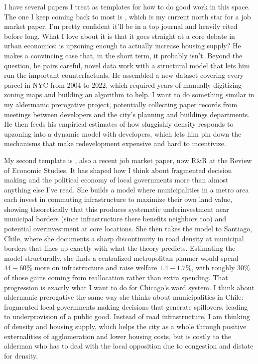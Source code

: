 \documentclass{article}
\begin{document}
I have several papers I treat as templates for how to do good work in this space.
The one I keep coming back to most is \cite{rollet_zoning_2025}, which is my current north star for a job market paper.
I'm pretty confident it'll be in a top journal and heavily cited before long.
What I love about it is that it goes straight at a core debate in urban economics: is upzoning enough to actually increase housing supply?
He makes a convincing case that, in the short term, it probably isn't.
Beyond the question, he pairs careful, novel data work with a structural model that lets him run the important counterfactuals.
He assembled a new dataset covering every parcel in NYC from 2004 to 2022, which required years of manually digitizing zoning maps and building an algorithm to help.
I want to do something similar in my aldermanic prerogative project, potentially collecting paper records from meetings between developers and the city's planning and buildings departments.
He then feeds his empirical estimates of how sluggishly density responds to upzoning into a dynamic model with developers, which lets him pin down the mechanisms that make redevelopment expensive and hard to incentivize.

My second template is \cite{bordeu_commuting_2025}, also a recent job market paper, now R\&R at the Review of Economic Studies.
It has shaped how I think about fragmented decision making and the political economy of local governments more than almost anything else I've read.
She builds a model where municipalities in a metro area each invest in commuting infrastructure to maximize their own land value, showing theoretically that this produces systematic underinvestment near municipal borders (since infrastructure there benefits neighbors too) and potential overinvestment at core locations.
She then takes the model to Santiago, Chile, where she documents a sharp discontinuity in road density at municipal borders that lines up exactly with what the theory predicts.
Estimating the model structurally, she finds a centralized metropolitan planner would spend $44-60\%$ more on infrastructure and raise welfare $1.4-1.7\%$, with roughly $30\%$ of those gains coming from reallocation rather than extra spending.
That progression is exactly what I want to do for Chicago's ward system.
I think about aldermanic prerogative the same way she thinks about municipalities in Chile: fragmented local governments making decisions that generate spillovers, leading to underprovision of a public good.
Instead of road infrastructure, I am thinking of density and housing supply, which helps the city as a whole through positive externalities of agglomeration and lower housing costs, but is costly to the alderman who has to deal with the local opposition due to congestion and distate for density.
\end{document}
